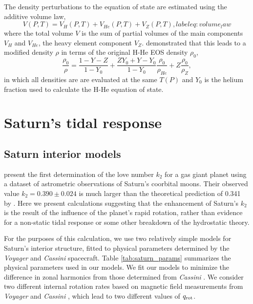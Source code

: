 The density perturbations to the equation of state are estimated using the additive
volume law,
%
\begin{equation} 
   V(P, T) = V_H(P, T) + V_{He}(P, T) + V_{Z}(P,T),
label{eq:volume_law}
\end{equation}
%
where the total volume $V$ is the sum of partial volumes of the main components $V_H$
and $V_{He}$, the heavy element component $V_Z$. \citet{hubbard2016} demonstrated
that this leads to a modified density $\rho$ in terms of the original H-He EOS
density $\rho_0$,
%
\begin{equation} 
   \frac{\rho_0}{\rho} = \frac{1-Y-Z}{1-Y_0} + 
   \frac{ZY_0 + Y - Y_0}{1-Y_0}\frac{\rho_0}{\rho_{He}} + Z\frac{\rho_0}{\rho_Z},
\label{eq:density_ratio}
\end{equation}
%
in which all densities are are evaluated at the same $T(P)$ and $Y_0$ is the helium
fraction used to calculate the H-He equation of state.


\section{Saturn's tidal response} \label{saturn}

\subsection{Saturn interior models}

\citet{lainey2016} present the first determination of the love number $k_2$ for a gas
giant planet using a dataset of astrometric observations of Saturn's coorbital moons.
Their observed value $k_2=0.390 \pm 0.024$ is much larger than the theoretical
prediction of 0.341 by \citet{gavrilov1977}. Here we present calculations suggesting
that the enhancement of Saturn's $k_2$ is the result of the influence of the planet's
rapid rotation, rather than evidence for a non-static tidal response or some other
breakdown of the hydrostatic theory.

For the purposes of this calculation, we use two relatively simple models for
Saturn's interior structure, fitted to physical parameters determined by the
\textit{Voyager} and \textit{Cassini} spacecraft. Table \ref{tab:saturn_params}
summarizes the physical parameters used in our models. We fit our models to minimize
the difference in zonal harmonics from those determined from \textit{Cassini}
\citep{Jacobson2006}.  We consider two different internal rotation rates based on
magnetic field measurements from \textit{Voyager} \citep{desch1981} and
\textit{Cassini} \citep{giampieri2006}, which lead to two different values of $q_{\rm
rot}$. 

